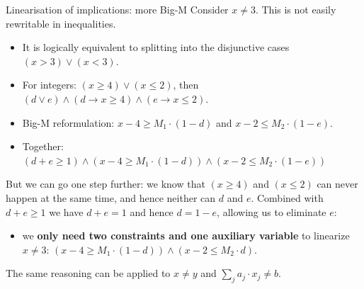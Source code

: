 \documentclass{cons-beamer}
\begin{document}
\begin{frame}{Linearisation of implications: more Big-M}
	Consider $x \neq 3$. This is not easily rewritable in inequalities.
	\vfill
	
	\begin{itemize}
		\item It is logically equivalent to splitting into the disjunctive cases $(x > 3) \lor (x < 3)$.
		\item For integers: $(x \geq 4) \lor (x \leq 2)$, then $(d \lor e) \land (d \rightarrow x \geq 4) \land (e \rightarrow x \leq 2)$.
		\item Big-M reformulation: $x - 4 \geq M_1\cdot (1-d)$ and $x - 2 \leq M_2\cdot (1-e)$.
		\item Together: $(d + e \geq 1) \land (x - 4 \geq M_1\cdot (1-d)) \land (x - 2 \leq M_2\cdot (1-e))$
	\end{itemize}
	\vfill
	\pause
		
	But we can go one step further: we know that $(x \geq 4)$ and $(x \leq 2)$ can never happen at the same time, and hence neither can $d$ and $e$. Combined with $d + e \geq 1$ we have $d + e = 1$ and hence $d = 1-e$, allowing us to eliminate $e$:
	\begin{itemize}
		\item we \textbf{only need two constraints and one auxiliary variable} to linearize $x \neq 3$: $(x - 4 \geq M_1\cdot (1-d)) \land (x - 2 \leq M_2\cdot d)$.
	\end{itemize}
	\pause
	
	The same reasoning can be applied to $x \neq y$ and $\sum_j a_j \cdot x_j \neq b$.
\end{frame}
\end{document}
